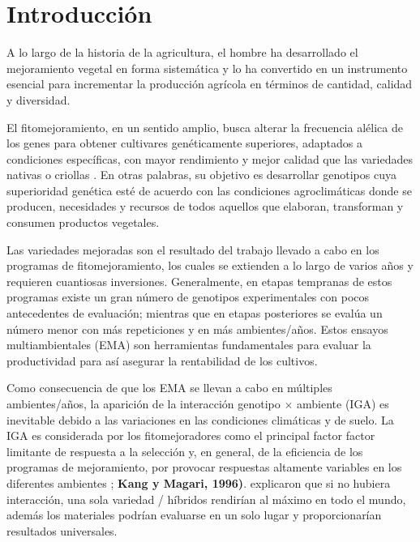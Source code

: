 

\chapter{Introducción}

A lo largo de la historia de la agricultura, el hombre ha desarrollado el mejoramiento vegetal en forma sistemática y lo ha convertido en un instrumento esencial para incrementar la producción agrícola en términos de cantidad, calidad y diversidad.  

El fitomejoramiento, en un sentido amplio, busca alterar la frecuencia alélica de los genes para obtener cultivares  genéticamente superiores, adaptados a condiciones específicas, con mayor rendimiento y mejor calidad que las variedades nativas o criollas \citep{Allard67}. En otras palabras, su objetivo es desarrollar genotipos cuya superioridad genética esté de acuerdo con las condiciones agroclimáticas donde se producen, necesidades y recursos de todos aquellos que elaboran, transforman y consumen productos vegetales. 

Las variedades mejoradas son el resultado del trabajo llevado a cabo en los programas de fitomejoramiento, los cuales se extienden a lo largo de varios años y requieren cuantiosas inversiones. Generalmente, en etapas tempranas de estos programas existe un gran número de genotipos experimentales con pocos antecedentes de evaluación; mientras que en etapas posteriores  se evalúa un número menor con más repeticiones y en más ambientes/años. Estos ensayos multiambientales (EMA) son herramientas fundamentales para evaluar la productividad para así asegurar la rentabilidad de los cultivos.

Como consecuencia de que los EMA se llevan a cabo en múltiples ambientes/años, la aparición de la interacción genotipo $\times$ ambiente (IGA) es inevitable debido a las variaciones en las condiciones climáticas y de suelo. La IGA es considerada por los fitomejoradores como el principal factor factor limitante de  respuesta a la selección y, en general, de la eficiencia de los programas de mejoramiento, por provocar respuestas altamente variables en los diferentes ambientes \citep{Crossaetal1990, CruzMedina1992}; \textbf{Kang y Magari, 1996)}. \citet{GauchZobel1997} explicaron que si no hubiera interacción, una sola variedad / híbridos rendirían al máximo en todo el mundo, además los materiales podrían evaluarse en un solo lugar y proporcionarían resultados universales.


